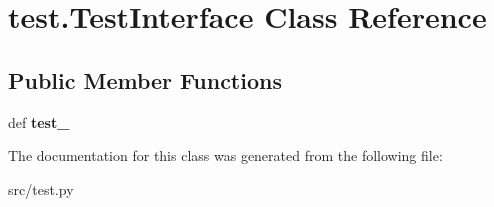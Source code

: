 \hypertarget{classtest_1_1_test_interface}{\section{test.\-Test\-Interface \-Class \-Reference}
\label{classtest_1_1_test_interface}
}
\subsection*{\-Public \-Member \-Functions}
\begin{DoxyCompactItemize}
\item 
\hypertarget{classtest_1_1_test_interface_a654b56179796283bd5127dc36a66a9c1}{def {\bfseries test\-\_\-}}\label{classtest_1_1_test_interface_a654b56179796283bd5127dc36a66a9c1}

\end{DoxyCompactItemize}


\-The documentation for this class was generated from the following file\-:\begin{DoxyCompactItemize}
\item 
src/test.\-py\end{DoxyCompactItemize}
